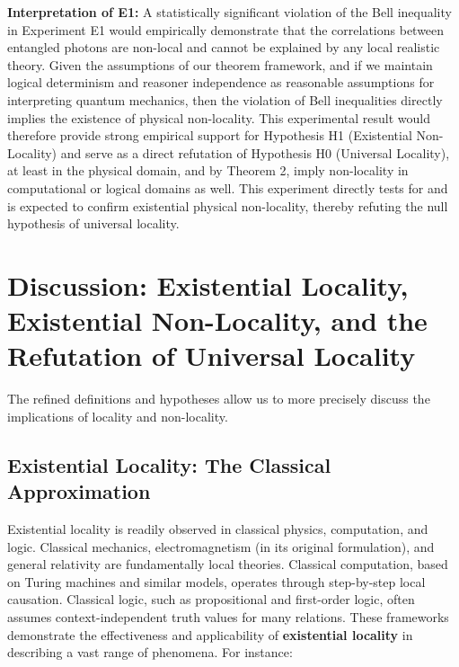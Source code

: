 \textbf{Interpretation of E1:}  A statistically significant violation of the Bell inequality in Experiment E1 would empirically demonstrate that the correlations between entangled photons are non-local and cannot be explained by any local realistic theory. Given the assumptions of our theorem framework, and if we maintain logical determinism and reasoner independence as reasonable assumptions for interpreting quantum mechanics, then the violation of Bell inequalities directly implies the existence of physical non-locality. This experimental result would therefore provide strong empirical support for Hypothesis H1 (Existential Non-Locality) and serve as a direct refutation of Hypothesis H0 (Universal Locality), at least in the physical domain, and by Theorem 2, imply non-locality in computational or logical domains as well. This experiment directly tests for and is expected to confirm existential physical non-locality, thereby refuting the null hypothesis of universal locality.
	
	\section{Discussion: Existential Locality, Existential Non-Locality, and the Refutation of Universal Locality}
	
	The refined definitions and hypotheses allow us to more precisely discuss the implications of locality and non-locality.
	
	\subsection{Existential Locality: The Classical Approximation}
	
	Existential locality is readily observed in classical physics, computation, and logic.  Classical mechanics, electromagnetism (in its original formulation), and general relativity are fundamentally local theories.  Classical computation, based on Turing machines and similar models, operates through step-by-step local causation.  Classical logic, such as propositional and first-order logic, often assumes context-independent truth values for many relations. These frameworks demonstrate the effectiveness and applicability of \textbf{existential locality} in describing a vast range of phenomena.  For instance:
	
